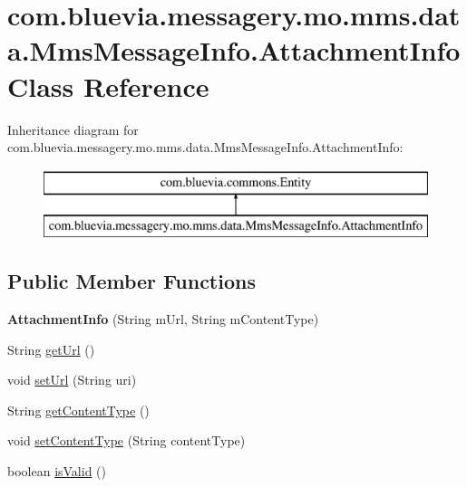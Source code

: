 \hypertarget{classcom_1_1bluevia_1_1messagery_1_1mo_1_1mms_1_1data_1_1MmsMessageInfo_1_1AttachmentInfo}{
\section{com.bluevia.messagery.mo.mms.data.MmsMessageInfo.AttachmentInfo Class Reference}
\label{classcom_1_1bluevia_1_1messagery_1_1mo_1_1mms_1_1data_1_1MmsMessageInfo_1_1AttachmentInfo}
}
Inheritance diagram for com.bluevia.messagery.mo.mms.data.MmsMessageInfo.AttachmentInfo:\begin{figure}[H]
\begin{center}
\leavevmode
\includegraphics[height=2.000000cm]{classcom_1_1bluevia_1_1messagery_1_1mo_1_1mms_1_1data_1_1MmsMessageInfo_1_1AttachmentInfo}
\end{center}
\end{figure}
\subsection*{Public Member Functions}
\begin{DoxyCompactItemize}
\item 
\hypertarget{classcom_1_1bluevia_1_1messagery_1_1mo_1_1mms_1_1data_1_1MmsMessageInfo_1_1AttachmentInfo_aa1285a29ec948aab1c1ceb2fbd708b70}{
{\bfseries AttachmentInfo} (String mUrl, String mContentType)}
\label{classcom_1_1bluevia_1_1messagery_1_1mo_1_1mms_1_1data_1_1MmsMessageInfo_1_1AttachmentInfo_aa1285a29ec948aab1c1ceb2fbd708b70}

\item 
String \hyperlink{classcom_1_1bluevia_1_1messagery_1_1mo_1_1mms_1_1data_1_1MmsMessageInfo_1_1AttachmentInfo_a06f6af8f62980d88b1da497700ee4a01}{getUrl} ()
\item 
void \hyperlink{classcom_1_1bluevia_1_1messagery_1_1mo_1_1mms_1_1data_1_1MmsMessageInfo_1_1AttachmentInfo_a456a4dbec60e257c4b8ac707aedcf964}{setUrl} (String uri)
\item 
String \hyperlink{classcom_1_1bluevia_1_1messagery_1_1mo_1_1mms_1_1data_1_1MmsMessageInfo_1_1AttachmentInfo_a3779e7024b7f72ef2b297b45e1bdedab}{getContentType} ()
\item 
void \hyperlink{classcom_1_1bluevia_1_1messagery_1_1mo_1_1mms_1_1data_1_1MmsMessageInfo_1_1AttachmentInfo_a0e3f5de1104b8a412e7944d4787c0e4d}{setContentType} (String contentType)
\item 
boolean \hyperlink{classcom_1_1bluevia_1_1messagery_1_1mo_1_1mms_1_1data_1_1MmsMessageInfo_1_1AttachmentInfo_ab946525ae9f4e912aefe327c3921b7b5}{isValid} ()
\end{DoxyCompactItemize}


